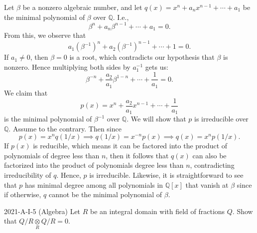 \documentclass{article}
\begin{document}
\begin{solutions}
	Let $\beta$ be a nonzero algebraic number, and let $q(x) = x^{n} + a_{n}x^{n- 1} + \dotsm + a_{1}$ be the minimal polynomial of $\beta$ over $\mathbb{Q}$. I.e., 
		\begin{equation}
			\beta^{n} + a_{n}\beta^{n-1} + \dotsm + a_{1} = 0. 
		\end{equation}
	From this, we observe that 
		\begin{equation}
			a_{1}(\beta^{-1})^{n} + a_{2}(\beta^{-1})^{n-1} + \dotsm + 1 = 0. 
		\end{equation}
	If $a_{1} \neq 0$, then $\beta = 0$ is a root, which contradicts our hypothesis that $\beta$ is nonzero. Hence multiplying both sides by $a_{1}^{-1}$ gets us: 
		\begin{equation}
			\beta^{-n} + \frac{a_{2}}{a_{1}}\beta^{1 - n} + \dotsm + \frac{1}{a_{1}} = 0. 
		\end{equation}
	We claim that 
		\begin{equation}
			p(x) = x^{n} + \frac{a_{2}}{a_{1}}x^{n - 1} + \dotsm + \frac{1}{a_{1}} 
		\end{equation}
	is the minimal polynomial of $\beta^{-1}$ over $\mathbb{Q}$. We will show that $p$ is irreducible over $\mathbb{Q}$. Assume to the contrary. Then since 
		\begin{equation}
			p(x) = x^{n}q(1/x) \implies q(1/x) = x^{-n}p(x) \implies q(x) = x^{n}p(1/x). 
		\end{equation}
	If $p(x)$ is reducible, which means it can be factored into the product of polynomials of degree less than $n$, then it follows that $q(x)$ can also be factorized into the product of polynomials degree less than $n$, contradicting irreducibility of $q$. Hence, $p$ is irreducible. Likewise, it is straightforward to see that $p$ has minimal degree among all polynomials in $\mathbb{Q}[x]$ that vanish at $\beta$ since if otherwise, $q$ cannot be the minimal polynomial of $\beta$. 
\end{solutions} 
\begin{prb}{2021-A-I-5 (Algebra)}
	Let $R$ be an integral domain with field of fractions $Q$. Show that $Q/R \mathop{\otimes}\limits_{R} Q/R = 0$. 
\end{prb}
\end{document}
